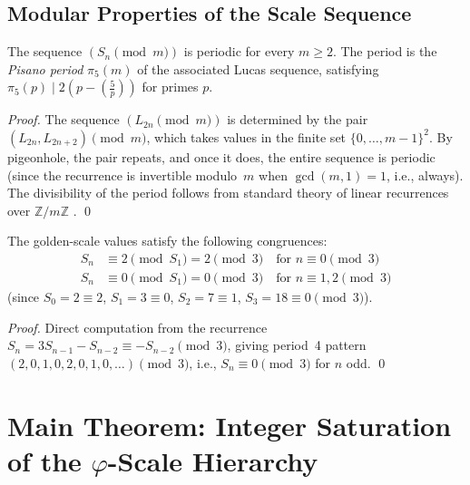 \subsection{Modular Properties of the Scale Sequence}
\label{subsec:gs-modular}

\begin{proposition}\label{prop:gs-pisano}
The sequence \((S_n \pmod{m})\) is periodic for every \(m \ge 2\).
The period is the \emph{Pisano period} \(\pi_5(m)\) of the
associated Lucas sequence, satisfying
\(\pi_5(p) \mid 2(p - \left(\frac{5}{p}\right))\) for primes \(p\).
\end{proposition}

\begin{proof}
The sequence \((L_{2n} \pmod{m})\) is determined by the pair
\((L_{2n}, L_{2n+2}) \pmod{m}\), which takes values in the finite
set \(\{0,\ldots,m-1\}^2\).  By pigeonhole, the pair repeats, and
once it does, the entire sequence is periodic (since the recurrence
is invertible modulo~\(m\) when \(\gcd(m,1)=1\), i.e., always).
The divisibility of the period follows from standard theory of linear
recurrences over \(\mathbb{Z}/m\mathbb{Z}\)
\cite{koshy_fib_lucas,vajda_fib_lucas}.
\qed
\end{proof}

\begin{corollary}\label{cor:gs-cong}
The golden-scale values satisfy the following congruences:
\begin{align*}
  S_n &\equiv 2 \pmod{S_1} = 2 \pmod{3} \quad \text{for } n \equiv 0 \pmod{3} \\
  S_n &\equiv 0 \pmod{S_1} = 0 \pmod{3} \quad \text{for } n \equiv 1,2 \pmod{3}
\end{align*}
(since \(S_0 = 2 \equiv 2\), \(S_1 = 3 \equiv 0\), \(S_2 = 7 \equiv 1\), \(S_3 = 18 \equiv 0 \pmod 3\)).
\end{corollary}

\begin{proof}
Direct computation from the recurrence \(S_n = 3S_{n-1} - S_{n-2} \equiv -S_{n-2} \pmod{3}\),
giving period~4 pattern \((2, 0, 1, 0, 2, 0, 1, 0, \ldots) \pmod{3}\),
i.e., \(S_n \equiv 0 \pmod 3\) for \(n\) odd.
\qed
\end{proof}

\section{Main Theorem: Integer Saturation of the \(\varphi\)-Scale Hierarchy}
\label{sec:gs-main}

